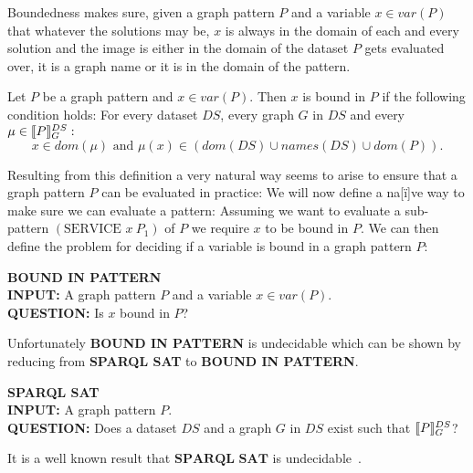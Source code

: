 Boundedness makes sure, given a graph pattern $P$ and a variable $x \in var(P)$
that whatever the solutions may be, $x$ is always in the domain of each
and every solution and the image is either in the domain of the dataset $P$ gets
evaluated over, it is a graph name or it is in the domain of the pattern.

\begin{definition}
Let $P$ be a graph pattern and $x \in var(P)$. Then $x$ is bound in $P$ if the
following condition holds:
For every dataset $DS$, every graph $G$ in $DS$ 
and every $\mu \in \llbracket P \rrbracket^{DS}_G:$\\
\[ x \in dom(\mu) \mbox{ and } \mu(x) \in (dom(DS) \cup names(DS) \cup dom(P)). \]
\end{definition}

Resulting from this definition a very natural way seems to arise to ensure that
a graph pattern $P$ can be evaluated in practice: 
We will now define a na[\"i]ve way to make sure we can evaluate a pattern:
Assuming we want to evaluate a sub-pattern $(\mbox{SERVICE } x \ P_1)$ of $P$
we require $x$ to be bound in $P$. We can then define the problem for deciding if a variable
is bound in a graph pattern $P$:

\begin{framed}\noindent \textbf{BOUND IN PATTERN}\\
	\textbf{INPUT:} A graph pattern $P$ and a variable $x \in var(P)$.\\
	\textbf{QUESTION:} Is $x$ bound in $P$?
\end{framed}
Unfortunately \textbf{BOUND IN PATTERN} is undecidable which can be shown by
reducing from \textbf{SPARQL SAT} to \textbf{BOUND IN PATTERN}.
\begin{framed}\noindent \textbf{SPARQL SAT}\\
	\textbf{INPUT:} A graph pattern $P$.\\
	\textbf{QUESTION:} Does a dataset $DS$ and a graph $G$ in $DS$ exist such
	that $\llbracket P \rrbracket^{DS}_G$?
\end{framed}
It is a well known result that $\textbf{SPARQL SAT}$ is undecidable~\cite{angles2008expressive}.

